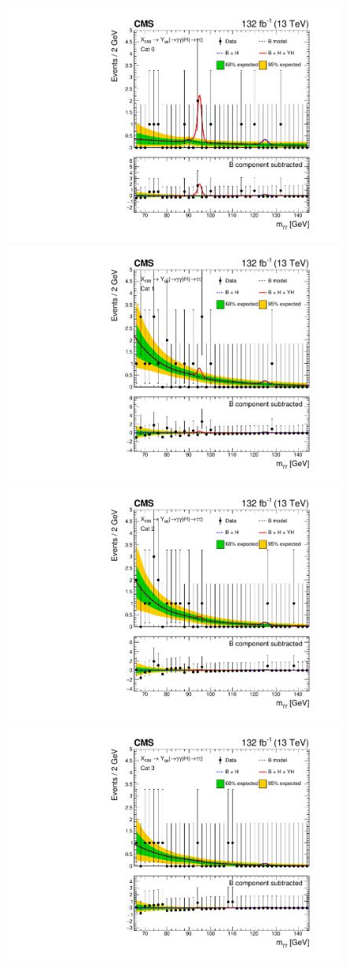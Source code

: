 \begin{figure}
\end{figure}

\begin{figure}
    \centering
    \includegraphics[width=.45\linewidth]{Figures/Dihiggs/results/sb_models/y_gg_low_mass_mx650my95/ARCGL_Y_gg_Low_Mass_mx650my100mh95_ggttresmx650my100cat0_CMS_hgg_mass_nbins40_paper.pdf}
    \includegraphics[width=.45\linewidth]{Figures/Dihiggs/results/sb_models/y_gg_low_mass_mx650my95/ARCGL_Y_gg_Low_Mass_mx650my100mh95_ggttresmx650my100cat1_CMS_hgg_mass_nbins40_paper.pdf}
    \includegraphics[width=.45\linewidth]{Figures/Dihiggs/results/sb_models/y_gg_low_mass_mx650my95/ARCGL_Y_gg_Low_Mass_mx650my100mh95_ggttresmx650my100cat2_CMS_hgg_mass_nbins40_paper.pdf}
    \includegraphics[width=.45\linewidth]{Figures/Dihiggs/results/sb_models/y_gg_low_mass_mx650my95/ARCGL_Y_gg_Low_Mass_mx650my100mh95_ggttresmx650my100cat3_CMS_hgg_mass_nbins40_paper.pdf}

\end{figure}
